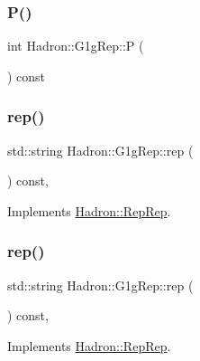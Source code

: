 \subsubsection{\texorpdfstring{P()}{P()}}
{\footnotesize\ttfamily int Hadron\+::\+G1g\+Rep\+::P (\begin{DoxyParamCaption}{ }\end{DoxyParamCaption}) const\hspace{0.3cm}{\ttfamily [inline]}}

\mbox{\label{structHadron_1_1G1gRep_ad03cbfd3310a65b26937f01ebaa044dd}} 
\subsubsection{\texorpdfstring{rep()}{rep()}\hspace{0.1cm}{\footnotesize\ttfamily [1/3]}}
{\footnotesize\ttfamily std\+::string Hadron\+::\+G1g\+Rep\+::rep (\begin{DoxyParamCaption}{ }\end{DoxyParamCaption}) const\hspace{0.3cm}{\ttfamily [inline]}, {\ttfamily [virtual]}}



Implements \mbox{\hyperlink{structHadron_1_1RepRep_ab3213025f6de249f7095892109575fde}{Hadron\+::\+Rep\+Rep}}.

\mbox{\label{structHadron_1_1G1gRep_ad03cbfd3310a65b26937f01ebaa044dd}} 
\subsubsection{\texorpdfstring{rep()}{rep()}\hspace{0.1cm}{\footnotesize\ttfamily [2/3]}}
{\footnotesize\ttfamily std\+::string Hadron\+::\+G1g\+Rep\+::rep (\begin{DoxyParamCaption}{ }\end{DoxyParamCaption}) const\hspace{0.3cm}{\ttfamily [inline]}, {\ttfamily [virtual]}}



Implements \mbox{\hyperlink{structHadron_1_1RepRep_ab3213025f6de249f7095892109575fde}{Hadron\+::\+Rep\+Rep}}.

